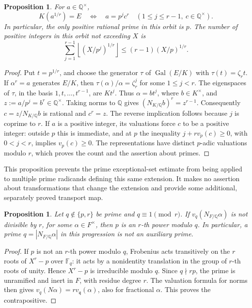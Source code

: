 \documentclass[11pt]{article}
\newtheorem{proposition}[theorem]{Proposition}
\theoremstyle{definition}
\theoremstyle{remark}
\begin{document}
\begin{proposition}\label{prop:rational-kummer-orbit}
For \(a\in\mathbb Q^\times\),
\[
 K(a^{1/r})=E
 \quad\Longleftrightarrow\quad
 a=p^j c^r\quad
 (1\leq j\leq r-1,\ c\in\mathbb Q^\times).
\]
In particular, the only positive rational prime in this orbit is \(p\).
The number of positive integers in this orbit not exceeding \(X\) is
\[
 \sum_{j=1}^{r-1}
 \left\lfloor (X/p^j)^{1/r}\right\rfloor
 \leq (r-1)(X/p)^{1/r}.
\]
\end{proposition}
\begin{proof}
Put \(t=p^{1/r}\), and choose the generator \(\tau\) of
\(\operatorname{Gal}(E/K)\) with \(\tau(t)=\zeta_r t\).
If \(\alpha^r=a\) generates \(E/K\), then
\(\tau(\alpha)/\alpha=\zeta_r^j\) for some \(1\leq j<r\).
The eigenspaces of \(\tau\), in the basis \(1,t,\ldots,t^{r-1}\),
are \(Kt^j\). Thus \(\alpha=bt^j\), where \(b\in K^\times\), and
\(z:=a/p^j=b^r\in\mathbb Q^\times\).
Taking norms to \(\mathbb Q\) gives
\((N_{K/\mathbb Q}b)^r=z^{r-1}\).
Consequently \(c=z/N_{K/\mathbb Q}b\) is rational and \(c^r=z\).
The reverse implication follows because \(j\) is coprime to \(r\).
If \(a\) is a positive integer, its valuations force \(c\) to be
a positive integer: outside \(p\) this is immediate, and at \(p\)
the inequality \(j+r v_p(c)\geq0\), with \(0<j<r\), implies
\(v_p(c)\geq0\). The representations have distinct \(p\)-adic
valuations modulo \(r\), which proves the count and the assertion
about primes.
\end{proof}

This proposition prevents the prime exceptional-set estimate from
being applied to multiple prime radicands defining this same extension.
It makes no assertion about transformations that change the extension
and provide some additional, separately proved transport map.

\begin{proposition}\label{prop:prime-norm-exclusion}
Let \(q\notin\{p,r\}\) be prime and \(q\equiv1\pmod r\).
If \(v_q(N_{F/\mathbb Q}\alpha)\) is not divisible by \(r\), for
some \(\alpha\in F^\times\), then \(p\) is an \(r\)-th power modulo \(q\).
In particular, a prime \(q=|N_{F/\mathbb Q}\alpha|\) in this
progression is not an auxiliary prime.
\end{proposition}
\begin{proof}
If \(p\) is not an \(r\)-th power modulo \(q\), Frobenius acts
transitively on the \(r\) roots of \(X^r-p\) over \(\mathbb F_q\):
it acts by a nonidentity translation in the group of \(r\)-th roots
of unity. Hence \(X^r-p\) is irreducible modulo \(q\).
Since \(q\nmid r p\), the prime is unramified and inert in \(F\),
with residue degree \(r\). The valuation formula for norms then gives
\(v_q(N\alpha)=r v_{\mathfrak q}(\alpha)\), also for fractional
\(\alpha\). This proves the contrapositive.
\end{proof}
\end{document}
